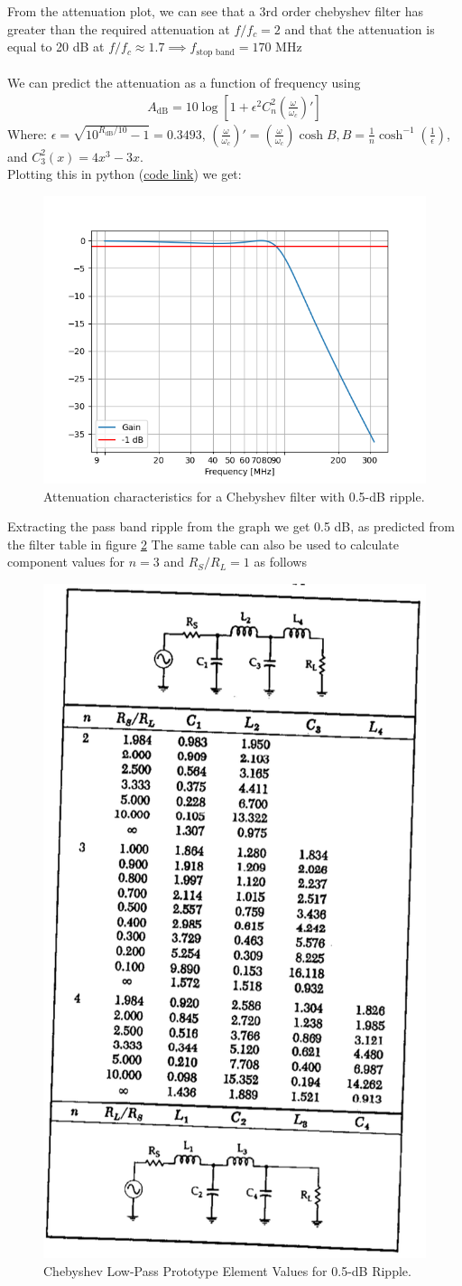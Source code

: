 \documentclass[letterpaper,12pt]{article}
\begin{document}
From the attenuation plot, we can see that a 3rd order chebyshev filter has greater than the required attenuation at $f/f_c=2$ and that the attenuation is equal to 20 dB at $f/f_c \approx 1.7 \implies f_\text{stop band}=170 \text{ MHz}$\\
\\
We can predict the attenuation as a function of frequency using
\begin{align*}
    A_\text{dB}=10\log\left[1+\epsilon^2C_n^2\left(\frac{\omega}{\omega_c}\right)'\right]
\end{align*}
Where:
$\epsilon=\sqrt{10^{R_\text{dB}/10}-1} = 0.3493$, 
$\left(\frac{\omega}{\omega_c}\right)' = \left(\frac{\omega}{\omega_c}\right) \cosh B, B=\frac{1}{n}\cosh^{-1}\left(\frac{1}{\epsilon}\right)$,
and $C^2_3(x)=4x^3-3x$. \\
Plotting this in python (\href{https://github.com/kavidey/e157/blob/main/dp_01/predict_chebyshev.py}{code link}) we get:
\begin{figure}[ht] 
    \centering \includegraphics[width=0.5\columnwidth]{figures/2.mag}
    \caption{
            \label{fig:2.mag}
            Attenuation characteristics for a Chebyshev filter with 0.5-dB ripple.
    }
\end{figure}
Extracting the pass band ripple from the graph we get 0.5 dB, as predicted from the filter table in figure \ref{fig:2.filter_table}
The same table can also be used to calculate component values for $n=3$ and $R_S/R_L = 1$ as follows
\begin{figure}[H] 
    \centering \includegraphics[width=0.3\columnwidth]{figures/2.filter_table}
    \caption{
            \label{fig:2.filter_table}
            Chebyshev Low-Pass Prototype Element Values for 0.5-dB Ripple.
    }
\end{figure}
\end{document}
